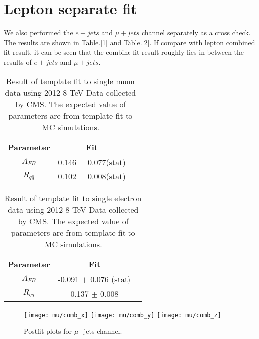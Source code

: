 \clearpage
\section{Lepton separate fit}
\label{lep seperate fit}

We also performed the $e+jets$ and $\mu+jets$ channel separately as a cross check. The results are shown in Table.[\ref{tab:result_mu}] and Table.[\ref{tab:result_el}]. If compare with lepton combined fit result, it can be seen that the combine fit result roughly lies in between the results of $e+jets$ and $\mu+jets$. 

\begin{table}[hbt]
\begin{center}
\begin{tabular}{c|cc}\hline
Parameter                   & Fit   \\
\hline
$A_{FB}$					   &  0.146 $\pm$ 0.077(stat)  \\
$R_{q\bar{q}}$			  &  0.102 $\pm$ 0.008(stat)  \\
\end{tabular}
\end{center}
\label{tab:result_mu}
\caption{Result of template fit to single muon data using 2012 8 TeV Data collected by CMS.  The expected value of parameters are from template fit to MC simulations. }
\end{table}

\begin{table}[hbt]
\begin{center}
\begin{tabular}{c|cc}\hline
Parameter                   & Fit   \\
\hline
$A_{FB}$						& -0.091  $\pm$ 0.076 (stat) \\
$R_{q\bar{q}}$ & 0.137 $\pm$ 0.008   \\
\end{tabular}
\end{center}
\label{tab:result_el}
\caption{Result of template fit to single electron data using 2012 8 TeV Data collected by CMS. The expected value of parameters are from template fit to MC simulations. }
\end{table}

\begin{figure}[hbt]
  \begin{center}
    \texttt{[image: mu/comb\_x]}
    \texttt{[image: mu/comb\_y]}
    \texttt{[image: mu/comb\_z]}
  \caption{\small Postfit plots for $\mu$+jets channel.}
    \label{fig:mu_postfit}
  \end{center}
\end{figure}

